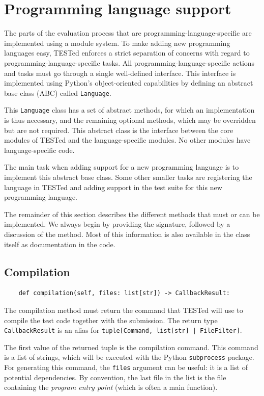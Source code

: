 \documentclass[../main]{subfiles}
\begin{document}
\section{Programming language support}\label{sec:programming-language-support}

The parts of the evaluation process that are programming-language-specific are implemented using a module system.
To make adding new programming languages easy, TESTed enforces a strict separation of concerns with regard to programming-language-specific tasks.
All programming-language-specific actions and tasks must go through a single well-defined interface.
This interface is implemented using Python's object-oriented capabilities by defining an abstract base class (ABC) called \texttt{Language}.

This \texttt{Language} class has a set of abstract methods, for which an implementation is thus necessary, and the remaining optional methods, which may be overridden but are not required.
This abstract class is the interface between the core modules of TESTed and the language-specific modules.
No other modules have language-specific code.

The main task when adding support for a new programming language is to implement this abstract base class.
Some other smaller tasks are registering the language in TESTed and adding support in the test suite for this new programming language.

The remainder of this section describes the different methods that must or can be implemented.
We always begin by providing the signature, followed by a discussion of the method.
Most of this information is also available in the class itself as documentation in the code.

\subsection{Compilation}\label{subsec:impl-compilation}

\begin{verbatim}
    def compilation(self, files: list[str]) -> CallbackResult:
\end{verbatim}

The compilation method must return the command that TESTed will use to compile the test code together with the submission.
The return type \texttt{CallbackResult} is an alias for \texttt{tuple[Command, list[str] | FileFilter]}.

The first value of the returned tuple is the compilation command.
This command is a list of strings, which will be executed with the Python \texttt{subprocess} package.
For generating this command, the \texttt{files} argument can be useful: it is a list of potential dependencies.
By convention, the last file in the list is the file containing the \emph{program entry point} (which is often a main function).
\end{document}
